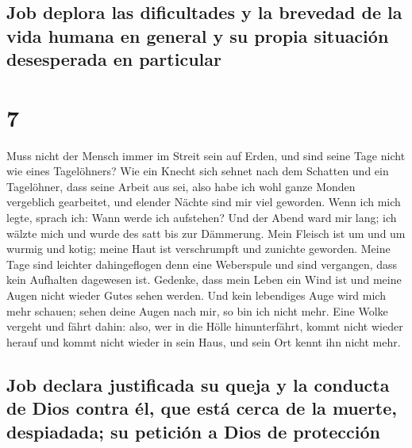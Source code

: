 \hypertarget{job-deplora-las-dificultades-y-la-brevedad-de-la-vida-humana-en-general-y-su-propia-situaciuxf3n-desesperada-en-particular}{%
\subsection{Job deplora las dificultades y la brevedad de la vida humana
en general y su propia situación desesperada en
particular}\label{job-deplora-las-dificultades-y-la-brevedad-de-la-vida-humana-en-general-y-su-propia-situaciuxf3n-desesperada-en-particular}}

\hypertarget{section-6}{%
\section{7}\label{section-6}}

 Muss nicht der Mensch immer im Streit sein auf Erden, und
sind seine Tage nicht wie eines Tagelöhners?  Wie ein
Knecht sich sehnet nach dem Schatten und ein Tagelöhner, dass seine
Arbeit aus sei,  also habe ich wohl ganze Monden
vergeblich gearbeitet, und elender Nächte sind mir viel geworden.
 Wenn ich mich legte, sprach ich: Wann werde ich
aufstehen? Und der Abend ward mir lang; ich wälzte mich und wurde des
satt bis zur Dämmerung.  Mein Fleisch ist um und um wurmig
und kotig; meine Haut ist verschrumpft und zunichte geworden.
 Meine Tage sind leichter dahingeflogen denn eine
Weberspule und sind vergangen, dass kein Aufhalten dagewesen ist.
 Gedenke, dass mein Leben ein Wind ist und meine Augen
nicht wieder Gutes sehen werden.  Und kein lebendiges Auge
wird mich mehr schauen; sehen deine Augen nach mir, so bin ich nicht
mehr.  Eine Wolke vergeht und fährt dahin: also, wer in
die Hölle hinunterfährt, kommt nicht wieder herauf  und
kommt nicht wieder in sein Haus, und sein Ort kennt ihn nicht mehr.

\hypertarget{job-declara-justificada-su-queja-y-la-conducta-de-dios-contra-uxe9l-que-estuxe1-cerca-de-la-muerte-despiadada-su-peticiuxf3n-a-dios-de-protecciuxf3n}{%
\subsection{Job declara justificada su queja y la conducta de Dios
contra él, que está cerca de la muerte, despiadada; su petición a Dios
de
protección}\label{job-declara-justificada-su-queja-y-la-conducta-de-dios-contra-uxe9l-que-estuxe1-cerca-de-la-muerte-despiadada-su-peticiuxf3n-a-dios-de-protecciuxf3n}}

